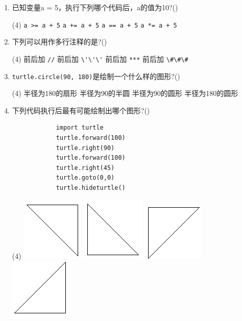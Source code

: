 \documentclass[11pt]{ctexart}
\begin{document}
\begin{enumerate}
        \item 已知变量a = 5，执行下列哪个代码后，a的值为10?(\qquad)
        \begin{tasks}(4)
            \task \lstinline!a >= a + 5!
            \task \lstinline!a += a + 5!
            \task \lstinline!a == a + 5!
            \task \lstinline!a *= a + 5!
        \end{tasks}

        \item 下列可以用作多行注释的是?(\qquad)
        \begin{tasks}(4)
            \task 前后加 \lstinline!//!
            \task 前后加 \lstinline!\'\'\'!
            \task 前后加 \lstinline!***!
            \task 前后加 \lstinline!\#\#\#!
        \end{tasks}

        \item \lstinline!turtle.circle(90, 180)!是绘制一个什么样的图形?(\qquad)
        \begin{tasks}(4)
            \task 半径为180的扇形
            \task 半径为90的半圆
            \task 半径为90的圆形
            \task 半径为180的圆形
        \end{tasks}

        \item 下列代码执行后最有可能绘制出哪个图形?(\qquad)
        \begin{lstlisting}
            import turtle
            turtle.forward(100)
            turtle.right(90)
            turtle.forward(100)
            turtle.right(45)
            turtle.goto(0,0)
            turtle.hideturtle()
        \end{lstlisting}
        \begin{tasks}(4)
            \task \includegraphics[width=.1\textwidth]{23a.png}
            \task \includegraphics[width=.1\textwidth]{23b.png}
            \task \includegraphics[width=.1\textwidth]{23c.png}
            \task \includegraphics[width=.1\textwidth]{23d.png}
        \end{tasks}


\end{enumerate}
\end{document}
